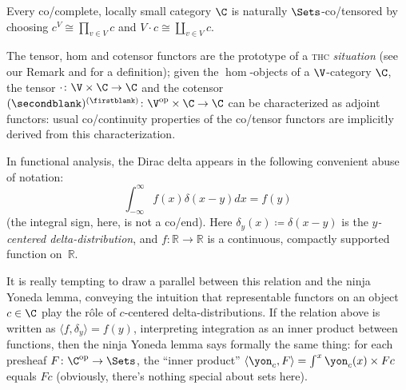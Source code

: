 \begin{example}
Every co/complete, locally small category $\C$ is naturally $\Sets$-co/tensored by choosing $c^V\cong \prod_{v\in V}c$ and $V\cdot c\cong \coprod_{v\in V}c$.
\end{example}
\begin{remark}\label{cocotens}
The tensor, hom and cotensor functors are the prototype of a \textsc{thc} \emph{situation} (see our Remark  and \cite[\S \textbf{1.1}]{Gray1980} for a definition); given the $\hom$-objects of a $\V$-category $\C$, the tensor $\cdot\colon \V\times \C\to \C$ and the cotensor $(\secondblank)^{(\firstblank)}\colon \V^\text{op}\times \C\to \C$ can be characterized as adjoint functors: usual co/continuity properties of the co/tensor functors are implicitly derived from this characterization.
\end{remark}
\begin{remark}\label{dirac}
In functional analysis, the Dirac delta appears in the following convenient abuse of notation:
\[
\int_{-\infty}^\infty f(x) \delta(x-y)dx = f(y)
\]
(the integral sign, here, is not a co/end). Here $\delta_y(x)  \coloneqq \delta(x-y)$ is the \emph{$y$-centered delta-distribution}, and $f\colon \mathbb{R}\to \mathbb{R}$ is a continuous, compactly supported function on~$\mathbb{R}$.

It is really tempting to draw a parallel between this relation and the ninja Yoneda lemma, conveying the intuition that representable functors on an object $c\in\C$ play the r\^ole of $c$-centered delta-distributions. If the relation above is written as $\langle f,\delta_y\rangle = f(y)$, interpreting integration as an inner product between functions, then the ninja Yoneda lemma says formally the same thing: for each presheaf $F\colon \C^\text{op} \to \Sets$, the ``inner product'' $\langle \yon_c, F\rangle = \int^x \yon_c(x)\times Fc$ equals $Fc$ (obviously, there's nothing special about sets here).
\end{remark}
